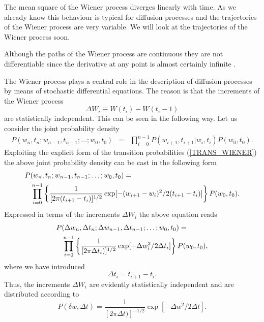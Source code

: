 The mean square of the Wiener process diverges linearly with time.
As we already know this behaviour is typical for diffusion 
processes and the trajectories of the Wiener process are very 
variable. We will look at the trajectories of the Wiener process 
soon. 

Although the paths of the Wiener process are continuous they are 
not differentiable since the derivative at any point is 
almost certainly infinite \cite{GARDINER}.

The Wiener process plays a central role in the description of 
diffusion processes by means of stochastic differential equations.
The reason is that the increments of the Wiener process
\begin{equation*}
\Delta W_i \equiv W(t_i) - W(t_i-1) 
\end{equation*}
are statistically independent. This can be seen in the following 
way. Let us consider the joint probability density
\begin{eqnarray*}
P(w_n,t_n; w_{n-1},t_{n-1}; \ldots ; w_0,t_0) &=&
\prod_{i=0}^{n-1} P(w_{i+1},t_{i+1}|w_i,t_i) P(w_0,t_0).
\end{eqnarray*}
Exploiting the explicit form of the transition probabilities
(\ref{TRANS_WIENER}) the above joint probability density can be 
cast in the following form
\begin{eqnarray*}
\lefteqn{P(w_n,t_n; w_{n-1},t_{n-1}; \ldots ; w_0,t_0) =} \\
& & \prod_{i=0}^{n-1} 
\left\{ \frac{1}{[2 \pi (t_{i+1}-t_i)]^{1/2}}
\exp[-(w_{i+1}-w_i)^2/2(t_{i+1}-t_i)]
\right\}
P(w_0,t_0).
\end{eqnarray*}
Expressed in terms of the increments $\Delta W_i$ the above 
equation reads
\begin{eqnarray*}
\lefteqn{
P(\Delta w_n,\Delta t_n; \Delta w_{n-1},\Delta t_{n-1}; \ldots ; w_0,t_0) =} \\
& &\prod_{i=0}^{n-1} 
\left\{ \frac{1}{[2 \pi \Delta t_i)]^{1/2}}
\exp[-\Delta w_i^2/2 \Delta t_i]
\right\}
P(w_0,t_0),
\end{eqnarray*}
where we have introduced
\begin{equation*}
\Delta t_i = t_{i+1} - t_i.
\end{equation*}
Thus, the increments $\Delta W_i$ are evidently statistically
independent and are distributed according to
\begin{equation*}
P(\delta w,\Delta t) = \frac{1}{[2 \pi \Delta t)]^{-1/2}}
\exp[-\Delta w^2/2 \Delta t].
\end{equation*}


